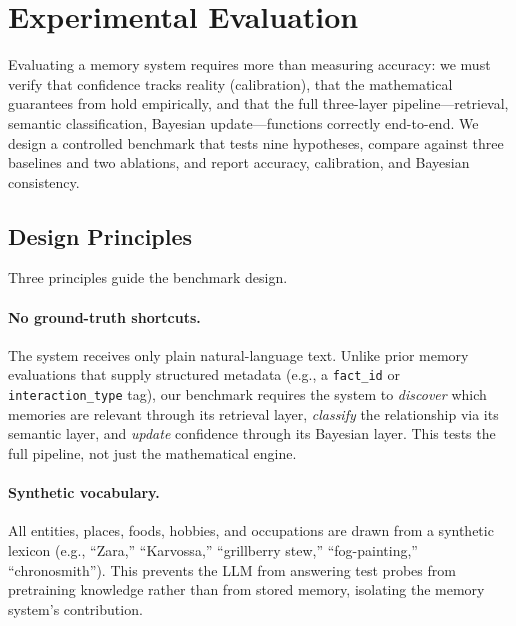 
\section{Experimental Evaluation}
\label{sec:experiments}

Evaluating a memory system requires more than measuring accuracy: we must verify that confidence tracks reality (calibration), that the mathematical guarantees from  hold empirically, and that the full three-layer pipeline---retrieval, semantic classification, Bayesian update---functions correctly end-to-end. We design a controlled benchmark that tests nine hypotheses, compare \membayes{} against three baselines and two ablations, and report accuracy, calibration, and Bayesian consistency.

\subsection{Design Principles}
\label{sec:bench-design}

Three principles guide the benchmark design.

\paragraph{No ground-truth shortcuts.}
The system receives only plain natural-language text. Unlike prior memory evaluations that supply structured metadata (e.g., a \texttt{fact\_id} or \texttt{interaction\_type} tag), our benchmark requires the system to \emph{discover} which memories are relevant through its retrieval layer, \emph{classify} the relationship via its semantic layer, and \emph{update} confidence through its Bayesian layer. This tests the full pipeline, not just the mathematical engine.

\paragraph{Synthetic vocabulary.}
All entities, places, foods, hobbies, and occupations are drawn from a synthetic lexicon (e.g., ``Zara,'' ``Karvossa,'' ``grillberry stew,'' ``fog-painting,'' ``chronosmith''). This prevents the LLM from answering test probes from pretraining knowledge rather than from stored memory, isolating the memory system's contribution.

